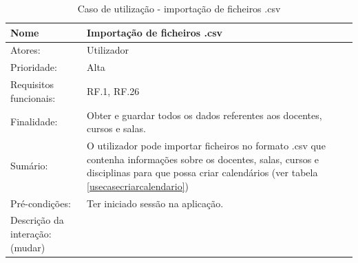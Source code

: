 \documentclass[11pt, twoside]{report}
\begin{document}
	\begin{table}[H]
		\caption{Caso de utilização - importação de ficheiros .csv}
		\label{usecaseimportarcsv}
		\begin{center}	
			\begin{tabularx}{\textwidth}{|l|X|}
				\hline
				\textbf{Nome }                      & \textbf{Importação de ficheiros .csv}                                                                                                                                                                                                   \\
				\hline
				Atores:                             & Utilizador                                                                                                                                                                                                                                \\
				\hline
				Prioridade:                         & Alta                                                                                                                                                                                                                                      \\
				\hline
				Requisitos funcionais:              & RF.1, RF.26                                                                                                                                                                                                                               \\
				\hline
				Finalidade:                         & Obter e guardar todos os dados referentes aos docentes, cursos e salas.                                                                                                                                                                   \\
				\hline
				Sumário:                           & O utilizador pode importar ficheiros no formato .csv que contenha informações sobre os docentes, salas, cursos e disciplinas para que possa criar calendários (ver tabela \ref{usecasecriarcalendario})                                \\
				\hline
				Pré-condições:                   & Ter iniciado sessão na aplicação.                                                                                                                                                                                                      \\
				\hline
				Descrição da interação: (mudar) &                                                                                                                                                                                                                                           \\

\end{tabularx}
\end{center}
\end{table}
\end{document}
